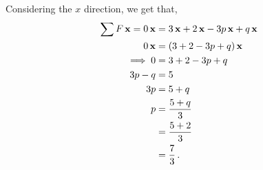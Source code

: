 \begin{subquestions}
Considering the $x$ direction, we get that,
\begin{align}
	\sum F\,\mathbf{x} = 0\,\mathbf{x} & = 3\,\mathbf{x} + 2\,\mathbf{x} -3p\,\mathbf{x} +q\,\mathbf{x} \nonumber \\
	                   0\,\mathbf{x} & = (3+2-3p+q)\,\mathbf{x} \nonumber \\
	\implies 0 & = 3+2-3p+q \nonumber \\
			 3p-q & = 5 \nonumber \\
	           3p & = 5+q \nonumber \\
	            p & = \frac{5+q}{3} \nonumber \\
	              & = \frac{5+2}{3} \nonumber \\
	              & = \frac{7}{3} \,.
\end{align}


\end{subquestions}
